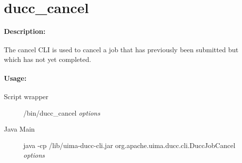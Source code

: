 % 
% 
% 
% 
\ifpdf
\else
{}
\fi
    \section{ducc\_cancel}
    \label{sec:cli.ducc-cancel}

    \paragraph{Description:}
    The cancel CLI is used to cancel a job that has previously been submitted but which has not yet 
    completed. 

    \paragraph{Usage:}
    \begin{description}
    \item[Script wrapper] \ducchome/bin/ducc\_cancel {\em options}
    \item[Java Main]      java -cp \ducchome/lib/uima-ducc-cli.jar org.apache.uima.ducc.cli.DuccJobCancel {\em options}
    \end{description}

